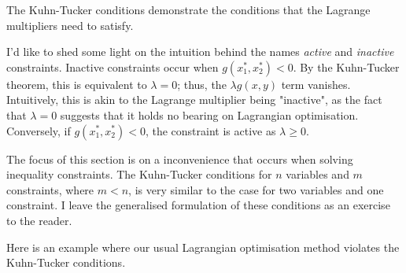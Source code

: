 \documentclass[a4paper, 12pt,oneside,openany]{book}
\begin{document}

The Kuhn-Tucker conditions demonstrate the conditions that the Lagrange multipliers need to satisfy. 


 I'd like to shed some light on the intuition behind the names \emph{active} and \emph{inactive} constraints. Inactive constraints occur when $g(x_1^*, x_2^*)<0$. By the Kuhn-Tucker theorem, this is equivalent to $\lambda=0$; thus, the $\lambda g(x, y)$ term vanishes. Intuitively, this is akin to the Lagrange multiplier being "inactive", as the fact that $\lambda=0$ suggests that it holds no bearing on Lagrangian optimisation. Conversely, if $g(x_1^*, x_2^*)<0$, the constraint is active as $\lambda \geq0$.

The focus of this section is on a inconvenience that occurs when solving inequality constraints. The Kuhn-Tucker conditions for $n$ variables and $m$ constraints, where $m<n$, is very similar to the case for two variables and one constraint. I leave the generalised formulation of these conditions as an exercise to the reader.

Here is an example where our usual Lagrangian optimisation method violates the Kuhn-Tucker conditions.
\end{document}
